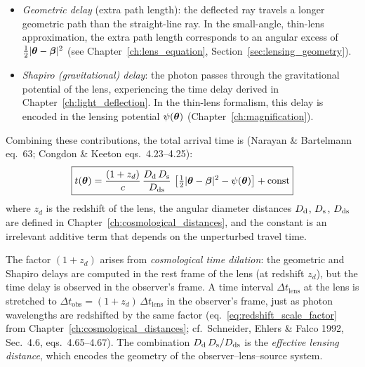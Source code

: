 \begin{itemize}
    \item \emph{Geometric delay} (extra path length): the deflected ray
          travels a longer geometric path than the straight-line ray.  In
          the small-angle, thin-lens approximation, the extra path length
          corresponds to an angular excess of $\tfrac{1}{2}|\boldsymbol{\theta} - \boldsymbol{\beta}|^2$
          (see Chapter~\ref{ch:lens_equation}, Section~\ref{sec:lensing_geometry}).
    \item \emph{Shapiro (gravitational) delay}: the photon passes
          through the gravitational potential of the lens, experiencing the
          time delay derived in Chapter~\ref{ch:light_deflection}.  In the
          thin-lens formalism, this delay is encoded in the
          lensing potential $\psi(\boldsymbol{\theta})$
          (Chapter~\ref{ch:magnification}).
\end{itemize}

Combining these contributions, the total arrival time is
(Narayan \& Bartelmann eq.~63; Congdon \& Keeton eqs.~4.23--4.25):
\begin{equation}
    \boxed{
    t(\boldsymbol{\theta}) = \frac{(1 + z_d)}{c}\,
    \frac{D_{\mathrm{d}}\,D_{\mathrm{s}}}{D_{\mathrm{ds}}}\,
    \left[\tfrac{1}{2}|\boldsymbol{\theta} - \boldsymbol{\beta}|^2 - \psi(\boldsymbol{\theta})\right]
    + \text{const}
    }
    \label{eq:time_delay_function}
\end{equation}
where $z_d$ is the redshift of the lens, the angular diameter distances
$D_{\mathrm{d}}$, $D_{\mathrm{s}}$, $D_{\mathrm{ds}}$ are defined in Chapter~\ref{ch:cosmological_distances},
and the constant is an irrelevant additive term that depends on the
unperturbed travel time.

The factor $(1 + z_d)$ arises from \emph{cosmological time dilation}:
the geometric and Shapiro delays are computed in the rest frame of the
lens (at redshift $z_d$), but the time delay is observed in
the observer's frame.  A time interval $\Delta t_{\mathrm{lens}}$ at
the lens is stretched to
$\Delta t_{\mathrm{obs}} = (1 + z_d)\,\Delta t_{\mathrm{lens}}$ in the
observer's frame, just as photon wavelengths are redshifted by the same
factor (eq.~\ref{eq:redshift_scale_factor} from
Chapter~\ref{ch:cosmological_distances}; cf.\ Schneider, Ehlers \&
Falco 1992, Sec.~4.6, eqs.~4.65--4.67).
The combination $D_{\mathrm{d}}\,D_{\mathrm{s}} / D_{\mathrm{ds}}$ is the \emph{effective lensing
distance}, which encodes the geometry of the observer--lens--source
system.

